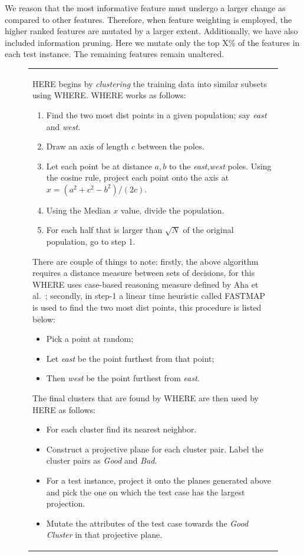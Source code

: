 \documentclass[conference]{IEEEtran}
\begin{document}
{We reason that the most informative feature must undergo a larger change as compared to other features. Therefore, when feature weighting is employed, the higher ranked features are mutated by a larger extent. Additionally, we have also included information pruning. Here we mutate only the top X\% of the features in each test instance. The remaining features remain unaltered. 
\begin{figure}[htbp!]
\small
\begin{tabular}{|p{.95\linewidth}|}\hline
HERE begins by \textit{clustering} the training data into similar subsets using WHERE. WHERE works as follows:
\begin{enumerate}
\item Find the two most dist points in a given population; say {\em east} and {\em west}. 
\item Draw an axis of length $c$ between the poles. 
\item Let each point be at distance $a,b$ to the {\em east,west} poles.  Using the cosine rule, project each point onto the  axis  at $x=(a^2 + c^2 - b^2)/(2c)$.  
\item Using the Median $x$ value, divide the population.
\item For each half that is larger than $\sqrt{N}$ of the original population, go to step 1.
\end{enumerate}

There are couple of things to note: firstly, the above algorithm requires a distance measure between sets of decisions, for this WHERE uses case-based reasoning measure defined by Aha et al.~\cite{aha91}; secondly, in step-1 a linear time heuristic called FASTMAP~\cite{fastmap} is used to find the two most dist points, this procedure is listed below:
\begin{itemize}
\item Pick a point at random; 
\item Let {\em east} be the point furthest from that point; 
\item Then {\em west} be the point furthest from {\em east}.
\end{itemize}

The final clusters that are found by WHERE are then used by HERE as follows:
\begin{itemize}
\item For each cluster find its nearest neighbor.
\item Construct a projective plane for each cluster pair. Label the cluster pairs as {\em Good} and {\em Bad}.
\item For a test instance, project it onto the planes generated above and pick the one on which the test case has the largest projection.
\item Mutate the attributes of the test case towards the {\em Good Cluster} in that projective plane. 
\end{itemize}


\end{tabular}
\end{figure}}
\end{document}
